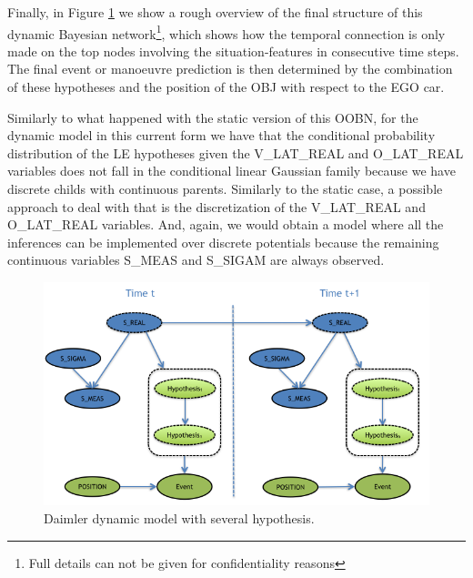 Finally, in Figure \ref{Figure:daimlerLEdynGeneric} we show a rough overview of the final structure of this dynamic Bayesian network\footnote{Full details can not be given for confidentiality reasons}, which shows how the temporal connection is only made on the top nodes involving the situation-features in consecutive time steps.  The final event or manoeuvre prediction is then determined by the combination of these hypotheses and the position of the OBJ with respect to the EGO car.

Similarly to what happened with the static version of this OOBN, for the dynamic model in this current form we have that the conditional probability distribution of the LE hypotheses given the V\_LAT\_REAL and O\_LAT\_REAL variables does not fall in the conditional linear Gaussian family \cite{nielsen2009bayesian} because we have discrete childs with continuous parents. Similarly to the static case, a possible approach to deal with that is the discretization of the V\_LAT\_REAL and O\_LAT\_REAL variables. And, again, we would obtain a model where all the inferences can be implemented over discrete potentials because the remaining continuous variables S\_MEAS and S\_SIGAM are always observed. 

\begin{figure}
\begin{center}
\includegraphics[scale=0.58]{./figures/DaimlerLEdynGeneric}
\end{center}
\caption{\label{Figure:daimlerLEdynGeneric}Daimler dynamic model with several hypothesis.}
\end{figure}



